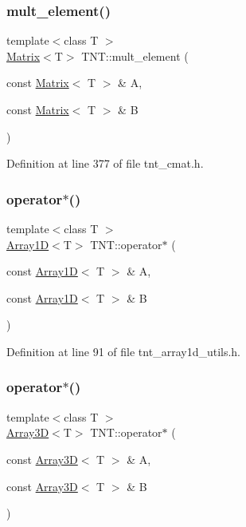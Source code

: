 \subsubsection{\texorpdfstring{mult\+\_\+element()}{mult\_element()}}
{\footnotesize\ttfamily template$<$class T $>$ \\
\hyperlink{classTNT_1_1Matrix}{Matrix}$<$T$>$ T\+N\+T\+::mult\+\_\+element (\begin{DoxyParamCaption}\item[{const \hyperlink{classTNT_1_1Matrix}{Matrix}$<$ T $>$ \&}]{A,  }\item[{const \hyperlink{classTNT_1_1Matrix}{Matrix}$<$ T $>$ \&}]{B }\end{DoxyParamCaption})}



Definition at line 377 of file tnt\+\_\+cmat.\+h.

\mbox{\label{namespaceTNT_a631669334b75ebb846723bf079fd2c8d}} 
\subsubsection{\texorpdfstring{operator$\ast$()}{operator*()}\hspace{0.1cm}{\footnotesize\ttfamily [1/8]}}
{\footnotesize\ttfamily template$<$class T $>$ \\
\hyperlink{classTNT_1_1Array1D}{Array1D}$<$T$>$ T\+N\+T\+::operator$\ast$ (\begin{DoxyParamCaption}\item[{const \hyperlink{classTNT_1_1Array1D}{Array1D}$<$ T $>$ \&}]{A,  }\item[{const \hyperlink{classTNT_1_1Array1D}{Array1D}$<$ T $>$ \&}]{B }\end{DoxyParamCaption})}



Definition at line 91 of file tnt\+\_\+array1d\+\_\+utils.\+h.

\mbox{\label{namespaceTNT_acee7fc2b1dccb1c2525cfb286a47e2ed}} 
\subsubsection{\texorpdfstring{operator$\ast$()}{operator*()}\hspace{0.1cm}{\footnotesize\ttfamily [2/8]}}
{\footnotesize\ttfamily template$<$class T $>$ \\
\hyperlink{classTNT_1_1Array3D}{Array3D}$<$T$>$ T\+N\+T\+::operator$\ast$ (\begin{DoxyParamCaption}\item[{const \hyperlink{classTNT_1_1Array3D}{Array3D}$<$ T $>$ \&}]{A,  }\item[{const \hyperlink{classTNT_1_1Array3D}{Array3D}$<$ T $>$ \&}]{B }\end{DoxyParamCaption})}



